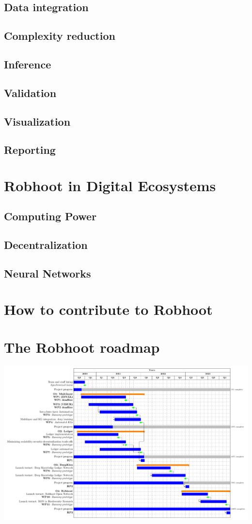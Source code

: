 \documentclass[10pt, a4paper, twocolumn]{article} %
\begin{document}
\subsection{Data integration}
\subsection{Complexity reduction}
\subsection{Inference}
\subsection{Validation}
\subsection{Visualization}
\subsection{Reporting}

\section{Robhoot in Digital Ecosystems}

\subsection{Computing Power}
\subsection{Decentralization}
\subsection{Neural Networks}

\section{How to contribute to Robhoot}

\section{The Robhoot roadmap}

\includegraphics[width=1\textwidth]{GanttChart.pdf}
\end{document}
